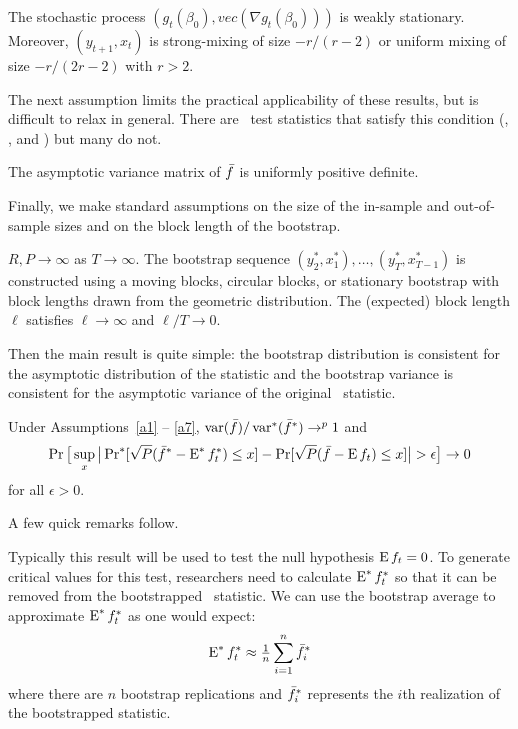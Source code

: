 \documentclass[12pt,fleqn]{article}
\begin{document}
\begin{asmp}\label{a3}
  The stochastic process $(g_t(\beta_0), vec(\nabla g_t(\beta_0)))$ is
  weakly stationary. Moreover, $(y_{t+1},x_t)$ is strong-mixing of
  size $-r/(r-2)$ or uniform mixing of size $-r/(2r-2)$ with $r>2$.
\end{asmp}

The next assumption limits the practical applicability of these
results, but is difficult to relax in general. There are \oos\ test
statistics that satisfy this condition (\citealp{GiW:06},
\citealp{ClW:06,ClW:07}, and \citealp{Cal:15}) but many do not.

\begin{asmp}\label{a6}
  The asymptotic variance matrix of $\bar f$ is uniformly positive definite.
\end{asmp}

Finally, we make standard assumptions on the size of the in-sample and
out-of-sample sizes and on the block length of the bootstrap.

\begin{asmp}\label{a7}
  $R, P \to \infty$ as $T \to \infty$.
  The bootstrap sequence $(y_2^*, x_1^*),\dots,(y_T^*, x_{T-1}^*)$ is
  constructed using a moving blocks, circular blocks, or stationary
  bootstrap with block lengths drawn from the geometric distribution.
  The (expected) block length $\ell$ satisfies $\ell \to \infty$
  and $\ell/T \to 0$.
\end{asmp}

Then the main result is quite simple: the bootstrap distribution is
consistent for the asymptotic distribution of the statistic and the
bootstrap variance is consistent for the asymptotic variance of the
original \oos\ statistic.

\begin{thm}\label{res:3}
  Under Assumptions~\ref{a1} -- \ref{a7}, $\operatorname{var}(\bar f)/\operatorname{var}^*(\bar f^*)
  \to^p 1$ and
  \begin{equation}\label{eq:15}
    \operatorname{Pr}\big[\sup_x \big\lvert \operatorname{Pr}^*[\sqrt{P} (\bar f^* - \operatorname{E}^* f_t^*) \leq x]
    - \operatorname{Pr}[\sqrt{P}( \bar{f} - \operatorname{E} f_t) \leq x] \big\rvert > \epsilon\big] \to 0
  \end{equation}
  for all $\epsilon > 0$.
\end{thm}

A few quick remarks follow.
\begin{rem}
  Typically this result will be used to test the null hypothesis $\operatorname{E}
  f_t = 0$. To generate critical values for this test, researchers
  need to calculate $\operatorname{E}^* f_t^*$ so that it can be removed from the
  bootstrapped \oos\ statistic. We can use the bootstrap average to
  approximate $\operatorname{E}^* f_t^*$ as one would expect:
  \begin{equation*}
    \operatorname{E}^* f_t^* \approx \tfrac{1}{n} \sum_{i=1}^n \bar f_i^*
  \end{equation*}
  where there are $n$ bootstrap replications and $\bar f_i^*$ represents
  the $i$th realization of the bootstrapped statistic.
\end{rem}
\end{document}
